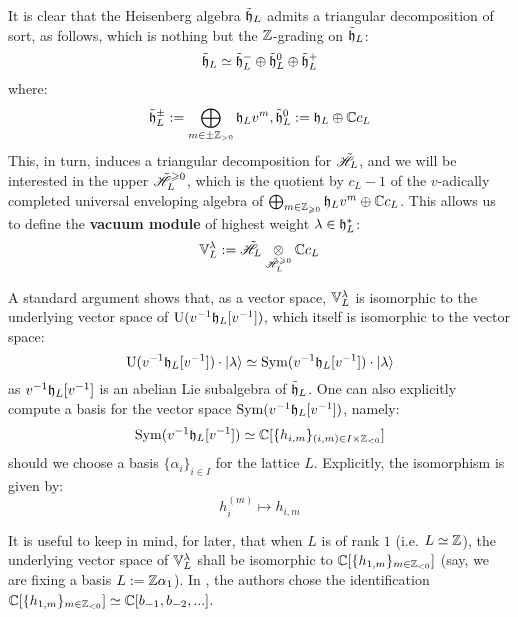         It is clear that the Heisenberg algebra $\tilde{\mathfrak{h}}_L$ admits a triangular decomposition of sort, as follows, which is nothing but the $\mathbb{Z}$-grading on $\tilde{\mathfrak{h}}_L$:
            $$\tilde{\mathfrak{h}}_L \simeq \tilde{\mathfrak{h}}_L^- \oplus \tilde{\mathfrak{h}}_L^0 \oplus \tilde{\mathfrak{h}}_L^+$$
        where:
            $$\tilde{\mathfrak{h}}_L^{\pm} := \bigoplus_{m \in \pm \mathbb{Z}_{> 0}} \mathfrak{h}_L v^m, \tilde{\mathfrak{h}}_L^0 := \mathfrak{h}_L \oplus \mathbb{C} c_L$$
        This, in turn, induces a triangular decomposition for $\tilde{\mathscr{H}}_L$, and we will be interested in the upper  $\tilde{\mathscr{H}}_L^{\geqslant 0}$, which is the quotient by $c_L - 1$ of the $v$-adically completed universal enveloping algebra of $\bigoplus_{m \in \mathbb{Z}_{\geqslant 0}} \mathfrak{h}_L v^m \oplus \mathbb{C} c_L$. This allows us to define the \textbf{vacuum module} of highest weight $\lambda \in \mathfrak{h}_L^*$:
            $$\V_L^{\lambda} := \tilde{\scrH}_L \tensor_{\tilde{\scrH}_L^{\geq 0}} \bbC c_L$$
            
        A standard argument shows that, as a vector space, $\mathbb{V}_L^{\lambda}$ is isomorphic to the underlying vector space of $\mathrm{U}(v^{-1}\mathfrak{h}_L[v^{-1}])$, which itself is isomorphic to the vector space:
            $$\mathrm{U}(v^{-1}\mathfrak{h}_L[v^{-1}]) \cdot \lvert {\lambda} \rangle \simeq \mathrm{Sym}( v^{-1}\mathfrak{h}_L[v^{-1}] ) \cdot \lvert {\lambda} \rangle$$
        as $v^{-1}\mathfrak{h}_L[v^{-1}]$ is an abelian Lie subalgebra of $\tilde{\mathfrak{h}}_L$. One can also explicitly compute a basis for the vector space $\mathrm{Sym}( v^{-1}\mathfrak{h}_L[v^{-1}] )$, namely:
            $$\Sym( v^{-1}\h_L[v^{-1}] ) \cong \bbC[ \{ h_{i, m} \}_{(i, m) \in I \x \Z_{< 0}} ]$$
        should we choose a basis $\{\alpha_i\}_{i \in I}$ for the lattice $L$. Explicitly, the isomorphism is given by:
            $$h_i^{(m)} \mapsto h_{i, m}$$
        \begin{remark}
            It is useful to keep in mind, for later, that when $L$ is of rank $1$ (i.e. $L \simeq \mathbb{Z}$), the underlying vector space of $\mathbb{V}_L^{\lambda}$ shall be isomorphic to $\mathbb{C}[\{h_{1, m}\}_{m \in \mathbb{Z}_{< 0}}]$ (say, we are fixing a basis $L := \mathbb{Z} \alpha_1$). In \cite{frenkel_ben_zvi_vertex_algebras_and_algebraic_curves}, the authors chose the identification $\mathbb{C}[\{h_{1, m}\}_{m \in \mathbb{Z}_{< 0}}] \simeq \mathbb{C}[b_{-1}, b_{-2}, ...]$.
        \end{remark} 
        
